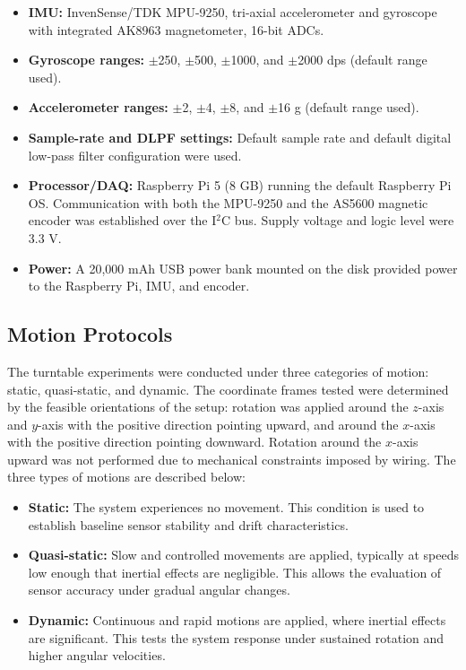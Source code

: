 \documentclass{iutbscthesis}
\begin{document}
\begin{itemize}
  \item \textbf{IMU:} InvenSense/TDK MPU-9250, tri-axial accelerometer and gyroscope with integrated AK8963 magnetometer, 16-bit ADCs.
  \item \textbf{Gyroscope ranges:} $\pm$250, $\pm$500, $\pm$1000, and $\pm$2000 dps (default range used).
  \item \textbf{Accelerometer ranges:} $\pm$2, $\pm$4, $\pm$8, and $\pm$16 g (default range used).
  \item \textbf{Sample-rate and DLPF settings:} Default sample rate and default digital low-pass filter configuration were used.
  \item \textbf{Processor/DAQ:} Raspberry Pi 5 (8 GB) running the default Raspberry Pi OS. Communication with both the MPU-9250 and the AS5600 magnetic encoder was established over 
                                the I$^2$C bus. Supply voltage and logic level were 3.3 V.
  \item \textbf{Power:} A 20,000 mAh USB power bank mounted on the disk provided power to the Raspberry Pi, IMU, and encoder.
\end{itemize}


\subsection{Motion Protocols}

The turntable experiments were conducted under three categories of motion: static, quasi-static, and dynamic. The coordinate frames tested were determined by the feasible orientations of the setup: rotation was applied around the $z$-axis and $y$-axis with the positive direction pointing upward, and around the $x$-axis with the positive direction pointing downward. Rotation around the $x$-axis upward was not performed due to mechanical constraints imposed by wiring. The three types of motions are described below:
\begin{itemize}
    \item \textbf{Static:} The system experiences no movement. This condition is used to establish baseline sensor stability and drift characteristics.
    
    \item \textbf{Quasi-static:} Slow and controlled movements are applied, typically at speeds low enough that inertial effects are negligible. This allows the evaluation of sensor accuracy under gradual angular changes.
    
    \item \textbf{Dynamic:} Continuous and rapid motions are applied, where inertial effects are significant. This tests the system response under sustained rotation and higher angular velocities.
\end{itemize}
\end{document}
